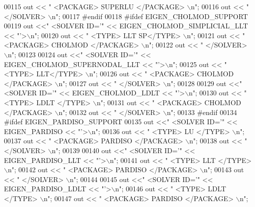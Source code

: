 \begin{DoxyCode}
00115   out << \textcolor{stringliteral}{"   <PACKAGE> SUPERLU </PACKAGE> \(\backslash\)n"}; 
00116   out << \textcolor{stringliteral}{"  </SOLVER> \(\backslash\)n"}; 
00117 \textcolor{preprocessor}{#endif}
00118 \textcolor{preprocessor}{#ifdef EIGEN\_CHOLMOD\_SUPPORT}
00119   out <<\textcolor{stringliteral}{"  <SOLVER ID='"} << EIGEN\_CHOLMOD\_SIMPLICIAL\_LLT << \textcolor{stringliteral}{"'>\(\backslash\)n"}; 
00120   out << \textcolor{stringliteral}{"   <TYPE> LLT SP</TYPE> \(\backslash\)n"};
00121   out << \textcolor{stringliteral}{"   <PACKAGE> CHOLMOD </PACKAGE> \(\backslash\)n"};
00122   out << \textcolor{stringliteral}{"  </SOLVER> \(\backslash\)n"}; 
00123   
00124   out <<\textcolor{stringliteral}{"  <SOLVER ID='"} << EIGEN\_CHOLMOD\_SUPERNODAL\_LLT << \textcolor{stringliteral}{"'>\(\backslash\)n"}; 
00125   out << \textcolor{stringliteral}{"   <TYPE> LLT</TYPE> \(\backslash\)n"};
00126   out << \textcolor{stringliteral}{"   <PACKAGE> CHOLMOD </PACKAGE> \(\backslash\)n"};
00127   out << \textcolor{stringliteral}{"  </SOLVER> \(\backslash\)n"};
00128   
00129   out <<\textcolor{stringliteral}{"  <SOLVER ID='"} << EIGEN\_CHOLMOD\_LDLT << \textcolor{stringliteral}{"'>\(\backslash\)n"}; 
00130   out << \textcolor{stringliteral}{"   <TYPE> LDLT </TYPE> \(\backslash\)n"};
00131   out << \textcolor{stringliteral}{"   <PACKAGE> CHOLMOD </PACKAGE> \(\backslash\)n"};  
00132   out << \textcolor{stringliteral}{"  </SOLVER> \(\backslash\)n"}; 
00133 \textcolor{preprocessor}{#endif}
00134 \textcolor{preprocessor}{#ifdef EIGEN\_PARDISO\_SUPPORT}
00135   out <<\textcolor{stringliteral}{"  <SOLVER ID='"} << EIGEN\_PARDISO << \textcolor{stringliteral}{"'>\(\backslash\)n"}; 
00136   out << \textcolor{stringliteral}{"   <TYPE> LU </TYPE> \(\backslash\)n"};
00137   out << \textcolor{stringliteral}{"   <PACKAGE> PARDISO </PACKAGE> \(\backslash\)n"}; 
00138   out << \textcolor{stringliteral}{"  </SOLVER> \(\backslash\)n"}; 
00139   
00140   out <<\textcolor{stringliteral}{"  <SOLVER ID='"} << EIGEN\_PARDISO\_LLT << \textcolor{stringliteral}{"'>\(\backslash\)n"}; 
00141   out << \textcolor{stringliteral}{"   <TYPE> LLT </TYPE> \(\backslash\)n"};
00142   out << \textcolor{stringliteral}{"   <PACKAGE> PARDISO </PACKAGE> \(\backslash\)n"}; 
00143   out << \textcolor{stringliteral}{"  </SOLVER> \(\backslash\)n"}; 
00144   
00145   out <<\textcolor{stringliteral}{"  <SOLVER ID='"} << EIGEN\_PARDISO\_LDLT << \textcolor{stringliteral}{"'>\(\backslash\)n"}; 
00146   out << \textcolor{stringliteral}{"   <TYPE> LDLT </TYPE> \(\backslash\)n"};
00147   out << \textcolor{stringliteral}{"   <PACKAGE> PARDISO </PACKAGE> \(\backslash\)n"}; 

\end{DoxyCode}
